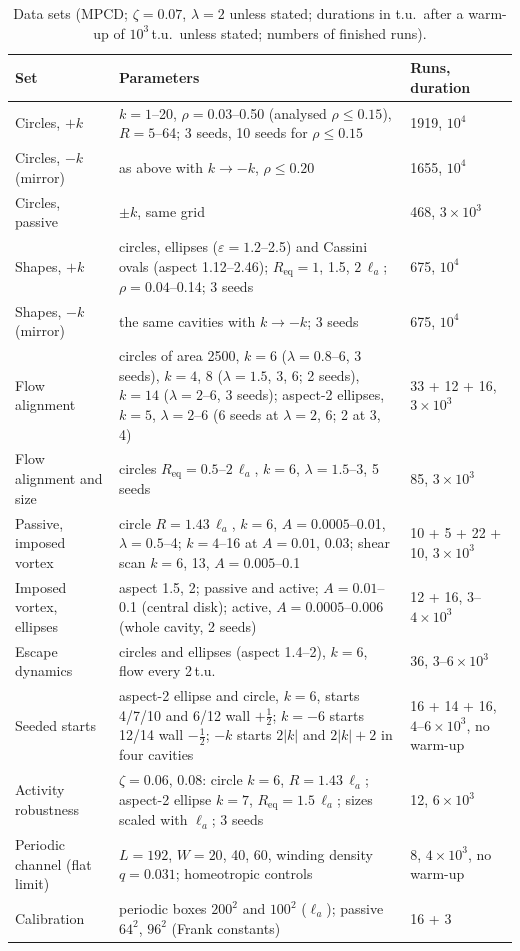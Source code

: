 \documentclass[aps,prl,onecolumn,superscriptaddress,amsmath,amssymb,nofootinbib]{revtex4-2}
\newcommand{\half}{\tfrac12}
\newcommand{\la}{\ell_a}
\begin{document}
\begin{table}[t]\centering\footnotesize
\caption{Data sets (MPCD; $\zeta=0.07$, $\lambda=2$ unless stated; durations in t.u.\ after a warm-up of $10^3$\,t.u.\ unless stated; numbers of finished runs).}\label{tab:s_runs}
\begin{tabular}{p{4.1cm}p{8.6cm}p{3.6cm}}\hline
Set & Parameters & Runs, duration\\\hline
Circles, $+k$ & $k=1$--20, $\rho=0.03$--0.50 (analysed $\rho\le0.15$), $R=5$--64; 3 seeds, 10 seeds for $\rho\le0.15$ & 1919, $10^4$\\
Circles, $-k$ (mirror) & as above with $k\to-k$, $\rho\le0.20$ & 1655, $10^4$\\
Circles, passive & $\pm k$, same grid & 468, $3\times10^3$\\
Shapes, $+k$ & circles, ellipses ($\varepsilon=1.2$--2.5) and Cassini ovals (aspect 1.12--2.46); $R_\mathrm{eq}=1$, 1.5, $2\,\la$; $\rho=0.04$--0.14; 3 seeds & 675, $10^4$\\
Shapes, $-k$ (mirror) & the same cavities with $k\to-k$; 3 seeds & 675, $10^4$\\
Flow alignment & circles of area 2500, $k=6$ ($\lambda=0.8$--6, 3 seeds), $k=4$, 8 ($\lambda=1.5$, 3, 6; 2 seeds), $k=14$ ($\lambda=2$--6, 3 seeds); aspect-2 ellipses, $k=5$, $\lambda=2$--6 (6 seeds at $\lambda=2$, 6; 2 at 3, 4) & 33 + 12 + 16, $3\times10^3$\\
Flow alignment and size & circles $R_\mathrm{eq}=0.5$--$2\,\la$, $k=6$, $\lambda=1.5$--3, 5 seeds & 85, $3\times10^3$\\
Passive, imposed vortex & circle $R=1.43\,\la$, $k=6$, $A=0.0005$--0.01, $\lambda=0.5$--4; $k=4$--16 at $A=0.01$, 0.03; shear scan $k=6$, 13, $A=0.005$--0.1 & 10 + 5 + 22 + 10, $3\times10^3$\\
Imposed vortex, ellipses & aspect 1.5, 2; passive and active; $A=0.01$--0.1 (central disk); active, $A=0.0005$--0.006 (whole cavity, 2 seeds) & 12 + 16, $3$--$4\times10^3$\\
Escape dynamics & circles and ellipses (aspect 1.4--2), $k=6$, flow every 2\,t.u. & 36, $3$--$6\times10^3$\\
Seeded starts & aspect-2 ellipse and circle, $k=6$, starts 4/7/10 and 6/12 wall $+\half$; $k=-6$ starts 12/14 wall $-\half$; $-k$ starts $2|k|$ and $2|k|+2$ in four cavities & 16 + 14 + 16, $4$--$6\times10^3$, no warm-up\\
Activity robustness & $\zeta=0.06$, 0.08: circle $k=6$, $R=1.43\,\la$; aspect-2 ellipse $k=7$, $R_\mathrm{eq}=1.5\,\la$; sizes scaled with $\la$; 3 seeds & 12, $6\times10^3$\\
Periodic channel (flat limit) & $L=192$, $W=20$, 40, 60, winding density $q=0.031$; homeotropic controls & 8, $4\times10^3$, no warm-up\\
Calibration & periodic boxes $200^2$ and $100^2$ ($\la$); passive $64^2$, $96^2$ (Frank constants) & 16 + 3\\\hline
\end{tabular}
\end{table}
\end{document}
